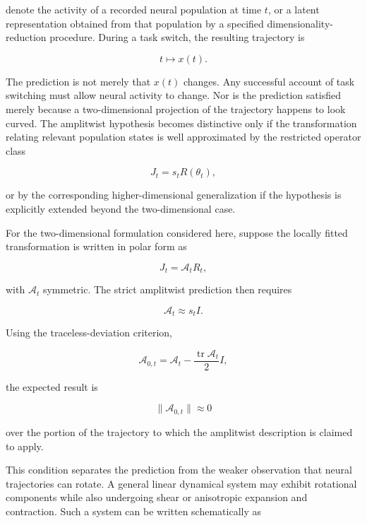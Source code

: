 \documentclass[11pt]{article}
\begin{document}
denote the activity of a recorded neural population at time $t$, or a latent representation obtained from that population by a specified dimensionality-reduction procedure. During a task switch, the resulting trajectory is

\begin{equation}
t\longmapsto x(t).
\end{equation}

The prediction is not merely that $x(t)$ changes. Any successful account of task switching must allow neural activity to change. Nor is the prediction satisfied merely because a two-dimensional projection of the trajectory happens to look curved. The amplitwist hypothesis becomes distinctive only if the transformation relating relevant population states is well approximated by the restricted operator class

\begin{equation}
J_t=s_tR(\theta_t),
\end{equation}

or by the corresponding higher-dimensional generalization if the hypothesis is explicitly extended beyond the two-dimensional case.

For the two-dimensional formulation considered here, suppose the locally fitted transformation is written in polar form as

\begin{equation}
J_t=\mathcal A_tR_t,
\end{equation}

with $\mathcal A_t$ symmetric. The strict amplitwist prediction then requires

\begin{equation}
\mathcal A_t\approx s_tI.
\end{equation}

Using the traceless-deviation criterion,

\begin{equation}
\mathcal A_{0,t}
=
\mathcal A_t
-
\frac{\operatorname{tr}\mathcal A_t}{2}I,
\end{equation}

the expected result is

\begin{equation}
\boxed{
\|\mathcal A_{0,t}\|\approx0
}
\end{equation}

over the portion of the trajectory to which the amplitwist description is claimed to apply.

This condition separates the prediction from the weaker observation that neural trajectories can rotate. A general linear dynamical system may exhibit rotational components while also undergoing shear or anisotropic expansion and contraction. Such a system can be written schematically as
\end{document}
